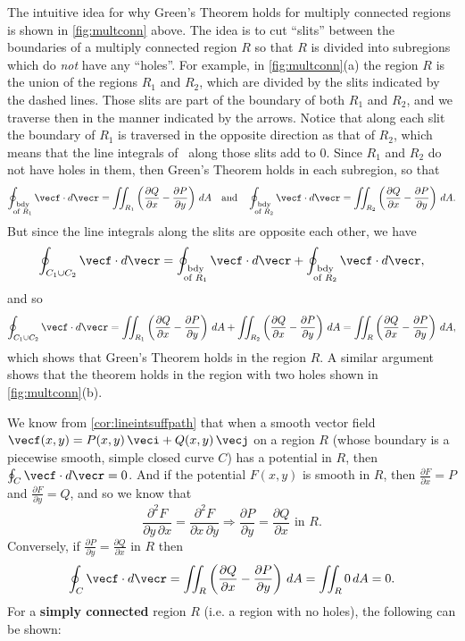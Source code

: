The intuitive idea for why Green's Theorem holds for multiply connected regions is shown in \autoref{fig:multconn} above. The idea is to cut ``slits'' between the boundaries of a multiply connected region $R$ so that $R$ is divided into subregions which do \emph{not} have any ``holes''. For example, in \autoref{fig:multconn}(a) the region $R$ is the union of the regions $R_1$ and $R_2$, which are divided by the slits indicated by the dashed lines. Those slits are part of the boundary of both $R_1$ and $R_2$, and we traverse then in the manner indicated by the arrows. Notice that along each slit the boundary of $R_1$ is traversed in the opposite direction as that of $R_2$, which means that the line integrals of \vecf\ along those slits add to 0. Since $R_1$ and $R_2$ do not have holes in them, then Green's Theorem holds in each subregion, so that
\[
 \oint_{\substack{\text{bdy}\\\text{of }R_1}}\vecf\cdot d\vecr = \iint_{R_1}
  \left( \frac{\partial Q}{\partial x} - \frac{\partial P}{\partial y} \right)\,dA \quad\text{and}\quad
 \oint_{\substack{\text{bdy}\\\text{of }R_2}}\vecf\cdot d\vecr = \iint_{R_2}
  \left( \frac{\partial Q}{\partial x} - \frac{\partial P}{\partial y} \right)\,dA .
\]
But since the line integrals along the slits are opposite each other, we have
\[
 \oint_{C_1 \cup C_2}\vecf\cdot d\vecr =
 \oint_{\substack{\text{bdy}\\\text{of }R_1}}\vecf\cdot d\vecr +
 \oint_{\substack{\text{bdy}\\\text{of }R_2}}\vecf\cdot d\vecr ,
\]
and so
\[
 \oint_{C_1 \cup C_2}\vecf\cdot d\vecr = \iint_{R_1}
  \left( \frac{\partial Q}{\partial x} - \frac{\partial P}{\partial y} \right)\,dA + \iint_{R_2}
  \left( \frac{\partial Q}{\partial x} - \frac{\partial P}{\partial y} \right)\,dA = \iint_{R}
  \left( \frac{\partial Q}{\partial x} - \frac{\partial P}{\partial y} \right)\,dA ,
\]
which shows that Green's Theorem holds in the region $R$. A similar argument shows that the theorem holds in the region with two holes shown in \autoref{fig:multconn}(b).

We know from \autoref{cor:lineintsuffpath} that when a smooth vector field $\vecf(x,y) = P(x,y)\,\veci + Q(x,y)\,\vecj$ on a region $R$ (whose boundary is a piecewise smooth, simple closed curve $C$) has a potential in $R$, then $\oint_{C}\vecf\cdot d\vecr = 0$. And if the potential $F(x,y)$ is smooth in $R$, then $\frac{\partial F}{\partial x} = P$ and $\frac{\partial F}{\partial y} = Q$, and so we know that
\[
 \frac{\partial^2 F}{\partial y \,\partial x} = \frac{\partial^2 F}{\partial x \,\partial y} \Rightarrow
 \frac{\partial P}{\partial y} = \frac{\partial Q}{\partial x} \text{ in $R$.}
\]
Conversely, if $\frac{\partial P}{\partial y} = \frac{\partial Q}{\partial x}$ in $R$ then
\[
 \oint_{C}\vecf\cdot d\vecr = \iint_{R} \left( \frac{\partial Q}{\partial x} -
   \frac{\partial P}{\partial y} \right)\,dA = \iint_{R} 0\,dA = 0 .
\]
For a \textbf{simply connected} region $R$ (i.e. a region with no holes), the following can be shown:


